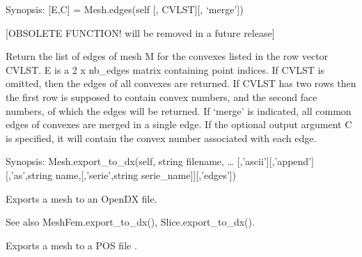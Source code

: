 \documentclass[a4paper,11pt,english]{sphinxmanual}
\begin{document}
\begin{fulllineitems}
\begin{fulllineitems}
\end{fulllineitems}


\begin{fulllineitems}
\label{\detokenize{python/cmdref_Mesh:getfem.Mesh.edges}}
Synopsis: {[}E,C{]} = Mesh.edges(self {[}, CVLST{]}{[}, ‘merge’{]})

{[}OBSOLETE FUNCTION! will be removed in a future release{]}

Return the list of edges of mesh M for the convexes listed in the
row vector CVLST. E is a 2 x nb\_edges matrix containing point
indices. If CVLST is omitted, then the edges of all convexes are
returned. If CVLST has two rows then the first row is supposed to
contain convex numbers, and the second face numbers, of which the
edges will be returned.  If ‘merge’ is indicated, all common
edges of convexes are merged in a single edge.  If the optional
output argument C is specified, it will contain the convex number
associated with each edge.

\end{fulllineitems}


\begin{fulllineitems}
\label{\detokenize{python/cmdref_Mesh:getfem.Mesh.export_to_dx}}
Synopsis: Mesh.export\_to\_dx(self, string filename, … {[},’ascii’{]}{[},’append’{]}{[},’as’,string name,{[},’serie’,string serie\_name{]}{]}{[},’edges’{]})

Exports a mesh to an OpenDX file.

See also MeshFem.export\_to\_dx(), Slice.export\_to\_dx().

\end{fulllineitems}


\begin{fulllineitems}
\label{\detokenize{python/cmdref_Mesh:getfem.Mesh.export_to_pos}}
Exports a mesh to a POS file .


\end{fulllineitems}
\end{fulllineitems}
\end{document}
